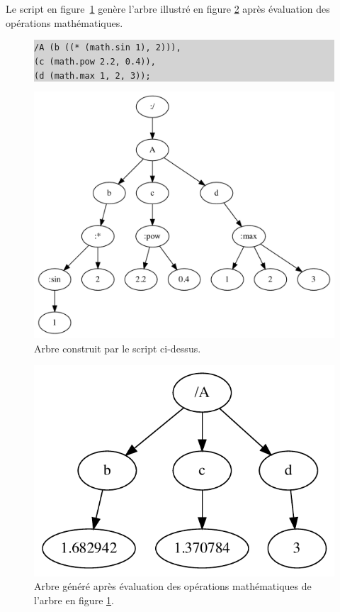 \documentclass{article}
\newcommand{\code}	[2][0.9]	{\vspace{0mm}\begin{center}\colorbox{lightgrey}{
							\begin{minipage}[t]{#1\columnwidth} 
							{\small \texttt{#2}}
							\end{minipage}}\end{center}}
\newcommand{\ulc}		{\hspace*{5.7mm}}
\begin{document}
Le script en figure~\ref{parsesample2} genère l'arbre illustré en figure \ref{treesample2} après évaluation des opérations mathématiques.
\begin{figure}[htbp]
\code{/A (b ((* (math.sin 1), 2))),\\
\ulc (c (math.pow 2.2, 0.4)),\\
\ulc (d (math.max 1, 2, 3));}
\begin{center}
\includegraphics[width=1\columnwidth]{tree/sample3}
\caption{Arbre construit par le script ci-dessus.}
\label{parsesample2}
\end{center}
\end{figure}

\begin{figure}[htbp]
\begin{center}
\includegraphics[width=0.62\columnwidth]{eval/sample3}
\caption{Arbre généré après évaluation des opérations mathématiques de l'arbre en figure \ref{parsesample2}.}
\label{treesample2}
\end{center}
\end{figure}
\end{document}
